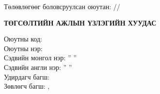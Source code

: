 \begin{titlepage}
\vspace{0.5cm}
Төлөвлөгөөг боловсруулсан оюутан: \makebox[3cm]{\dotfill} /\shortname/

\end{titlepage}

\newpage
\begin{titlepage}
	
	\small	
	\begin{center}
		\textbf{{\large ТӨГСӨЛТИЙН АЖЛЫН ҮЗЛЭГИЙН ХУУДАС}}\\
	\end{center}
	\vspace*{0.5cm}
	\noindent Оюутны код: \studentcode \\
	Оюутны нэр: \shortname \\
	Сэдвийн монгол нэр: '' \ttitle '' \\
	Сэдвийн англи нэр: '' \ttitleng ''\\
	Удирдагч багш: \supname\\
	Зөвлөгч багш: \advicenameA, \advicenameB \\
	

\end{titlepage}

